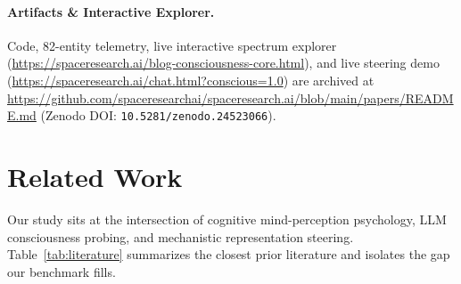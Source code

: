 \documentclass[10pt]{article}
\begin{document}
\paragraph{Artifacts \& Interactive Explorer.} Code, 82-entity telemetry, live interactive spectrum explorer (\url{https://spaceresearch.ai/blog-consciousness-core.html}), and live steering demo (\url{https://spaceresearch.ai/chat.html?conscious=1.0}) are archived at \url{https://github.com/spaceresearchai/spaceresearch.ai/blob/main/papers/README.md} (Zenodo DOI: \texttt{10.5281/zenodo.24523066}).

\section{Related Work}
\label{sec:related}

Our study sits at the intersection of cognitive mind-perception psychology, LLM consciousness probing, and mechanistic representation steering. Table~\ref{tab:literature} summarizes the closest prior literature and isolates the gap our benchmark fills.
\end{document}
